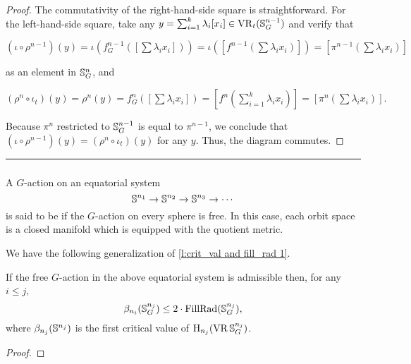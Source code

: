 \begin{proof}
	The commutativity of the right-hand-side square is straightforward.
	For the left-hand-side square, take any $y = \sum_{i=1}^k \lambda_i [x_i] \in \operatorname{VR}_t(\mathbb{S}^{n-1}_G)$ and verify that
	\begin{center}
		$(\iota \circ \rho^{n-1})(y)
		=\iota(f^{n-1}_G([\sum \lambda_i x_i]))
		=\iota([f^{n-1}(\sum \lambda_i x_i)])
		=[\pi^{n-1}(\sum \lambda_i x_i)]
		$
	\end{center}
	as an element in $\mathbb{S}^n_G$, and
	\begin{center}
		$(\rho^{n} \circ \iota_t)(y) = \rho^{n}(y) = f^{n}_G([\sum \lambda_i x_i]) = [f^{n}(\sum_{i=1}^k \lambda_i x_i)] = [\pi^{n}(\sum \lambda_i x_i)].
		$
	\end{center}
	Because $\pi^{n}$ restricted to $\mathbb{S}^{n-1}_G$ is equal to $\pi^{n-1}$, we conclude that $(\iota \circ \rho^{n-1})(y) = (\rho^n \circ \iota_t)(y)$ for any $y$.
	Thus, the diagram commutes.
\end{proof}

\noindent\rule{\textwidth}{0.4pt}

\subsubsection{}\label{subsub:foundamental_bar_rpn_lemma}

A \(G\)-action on an equatorial system
\[
\mathbb{S}^{n_1} \to \mathbb{S}^{n_2} \to \mathbb{S}^{n_3} \to \dotsb
\]
is said to be  if the \(G\)-action on every sphere is free.
In this case, each orbit space is a closed manifold which is equipped with the quotient metric.

We have the following generalization of \cref{l:crit_val and fill_rad 1}.

\medskip\lemma If the free \(G\)-action in the above equatorial system is admissible then, for any \(i \leq j\),
\[
\beta_{n_i}(\mathbb{S}^{n_j}_G) \leq 2 \cdot \operatorname{FillRad}(\mathbb{S}^{n_j}_G),
\]
where \(\beta_{n_j}(\mathbb{S}^{n_j})\) is the first critical value of \(\mathrm{H}_{n_j}(\operatorname{VR} \mathbb{S}^{n_j}_G)\).

\begin{proof}
\end{proof}

